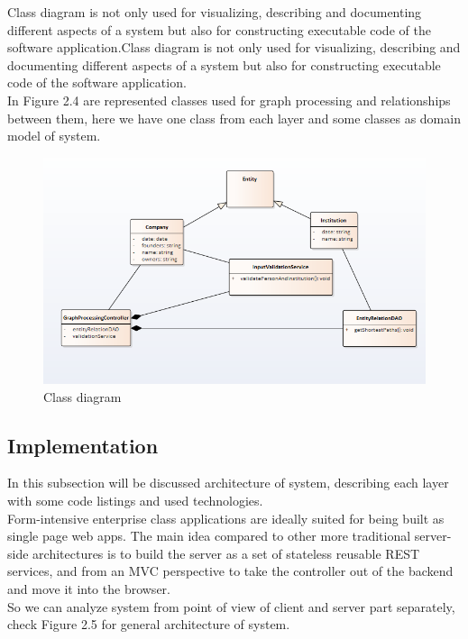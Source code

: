 \documentclass[12pt,a4paper,titlepage]{article}
\begin{document}
Class diagram is not only used for visualizing, describing and documenting different aspects
of a system but also for constructing executable code of the software application.Class diagram is
not only used for visualizing, describing and documenting different aspects of a system but also for
constructing executable code of the software application.\\

In Figure 2.4 are represented classes used for graph processing and relationships between them, here we have one class from each layer and some classes as domain model of system.
\begin{figure}[!ht] 
	\renewcommand\thefigure{2.4} %
	\centering 
	\includegraphics[width=17cm]{class.png} 
	\caption{ Class diagram }\label{fig}
	\end{figure}



\subsection{Implementation}

In this subsection will be discussed architecture of system, describing each layer with some code listings and used technologies.\\

Form-intensive enterprise class applications are ideally suited for being built as single page web apps. The main idea compared to other more traditional server-side architectures is to build the server as a set of stateless reusable REST services, and from an MVC perspective to take the controller out of the backend and move it into the browser.\\

So we can analyze system from point of view of client and server part separately, check Figure 2.5 for general architecture of system.
\end{document}

